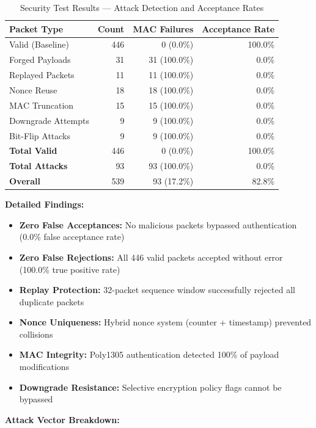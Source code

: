 \documentclass[11pt,a4paper]{article}
\begin{document}
\begin{table}[H]
\centering
\begin{tabular}{@{}lrrr@{}}
\toprule
\textbf{Packet Type} & \textbf{Count} & \textbf{MAC Failures} & \textbf{Acceptance Rate} \\
\midrule
Valid (Baseline) & 446 & 0 (0.0\%) & 100.0\% \\
Forged Payloads & 31 & 31 (100.0\%) & 0.0\% \\
Replayed Packets & 11 & 11 (100.0\%) & 0.0\% \\
Nonce Reuse & 18 & 18 (100.0\%) & 0.0\% \\
MAC Truncation & 15 & 15 (100.0\%) & 0.0\% \\
Downgrade Attempts & 9 & 9 (100.0\%) & 0.0\% \\
Bit-Flip Attacks & 9 & 9 (100.0\%) & 0.0\% \\
\midrule
\textbf{Total Valid} & 446 & 0 (0.0\%) & 100.0\% \\
\textbf{Total Attacks} & 93 & 93 (100.0\%) & 0.0\% \\
\textbf{Overall} & 539 & 93 (17.2\%) & 82.8\% \\
\bottomrule
\end{tabular}
\caption{Security Test Results --- Attack Detection and Acceptance Rates}
\end{table}

\textbf{Detailed Findings:}
\begin{itemize}[noitemsep]
    \item \textbf{Zero False Acceptances:} No malicious packets bypassed authentication (0.0\% false acceptance rate)
    \item \textbf{Zero False Rejections:} All 446 valid packets accepted without error (100.0\% true positive rate)
    \item \textbf{Replay Protection:} 32-packet sequence window successfully rejected all duplicate packets
    \item \textbf{Nonce Uniqueness:} Hybrid nonce system (counter + timestamp) prevented collisions
    \item \textbf{MAC Integrity:} Poly1305 authentication detected 100\% of payload modifications
    \item \textbf{Downgrade Resistance:} Selective encryption policy flags cannot be bypassed
\end{itemize}

\textbf{Attack Vector Breakdown:}
\end{document}
